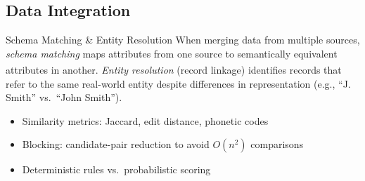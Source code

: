 \subsection{Data Integration}

\begin{v3topic}{Schema Matching \& Entity Resolution}
    When merging data from multiple sources, \emph{schema matching} maps attributes from one source to semantically equivalent attributes in another\textsuperscript{\cite{hanDataMiningConcepts2012}}.
    \emph{Entity resolution} (record linkage) identifies records that refer to the same real-world entity despite differences in representation (e.g., ``J. Smith'' vs.\ ``John Smith'').
\visualseparator
    \begin{itemize}
        \item Similarity metrics: Jaccard, edit distance, phonetic codes
        \item Blocking: candidate-pair reduction to avoid $O(n^2)$ comparisons
        \item Deterministic rules vs.\ probabilistic scoring
    \end{itemize}

\end{v3topic}
